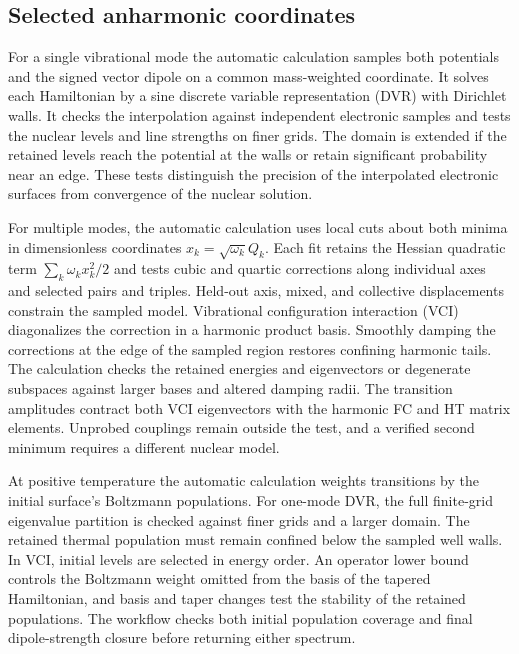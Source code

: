 \subsection{Selected anharmonic coordinates}

For a single vibrational mode the automatic calculation samples both
potentials and the signed vector dipole on a common mass-weighted
coordinate. It solves each Hamiltonian by a sine discrete variable
representation (DVR) with Dirichlet walls. It checks the interpolation
against independent electronic samples and tests the nuclear levels and
line strengths on finer grids. The domain is extended if the retained
levels reach the potential at the walls or retain significant probability
near an edge. These tests distinguish the precision of the interpolated
electronic surfaces from convergence of the nuclear solution.\cite{dvr}

For multiple modes, the automatic calculation uses local cuts about both
minima in dimensionless coordinates $x_k=\sqrt{\omega_k}Q_k$. Each fit
retains the Hessian quadratic term $\sum_k\omega_k x_k^2/2$ and tests cubic
and quartic corrections along individual axes and selected pairs and
triples. Held-out axis, mixed, and collective displacements constrain the
sampled model. Vibrational configuration interaction (VCI) diagonalizes
the correction in a harmonic product basis. Smoothly damping the
corrections at the edge of the sampled region restores confining harmonic
tails. The calculation checks the retained energies and eigenvectors or
degenerate subspaces against larger bases and altered damping radii. The
transition amplitudes contract both VCI eigenvectors with the harmonic
FC and HT matrix elements. Unprobed couplings remain outside the test,
and a verified second minimum requires a different nuclear model.

At positive temperature the automatic calculation weights transitions by
the initial surface's Boltzmann populations. For one-mode DVR, the full
finite-grid eigenvalue partition is checked against finer grids and a
larger domain. The retained thermal population must remain confined below
the sampled well walls. In VCI, initial levels are selected in energy
order. An operator lower bound controls the Boltzmann weight omitted from
the basis of the tapered Hamiltonian, and basis and taper changes test
the stability of the retained populations. The workflow checks both
initial population coverage and final dipole-strength closure before
returning either spectrum.

